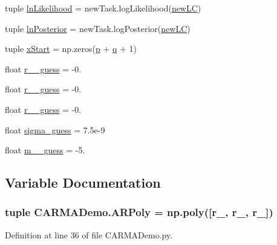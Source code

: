 \begin{DoxyCompactItemize}
\item 
tuple \hyperlink{namespace_c_a_r_m_a_demo_adb10228a4680a9d3c21526a3b3255882}{ln\-Likelihood} = new\-Task.\-log\-Likelihood(\hyperlink{namespace_c_a_r_m_a_demo_a00f90358447346616f81cdf0ba8454e2}{new\-L\-C})
\item 
tuple \hyperlink{namespace_c_a_r_m_a_demo_aac99121f005f33a0a43e2daf6480c639}{ln\-Posterior} = new\-Task.\-log\-Posterior(\hyperlink{namespace_c_a_r_m_a_demo_a00f90358447346616f81cdf0ba8454e2}{new\-L\-C})
\item 
tuple \hyperlink{namespace_c_a_r_m_a_demo_a4a968eb0ebec9a8a1dd2e0beb557ee70}{x\-Start} = np.\-zeros(\hyperlink{namespace_c_a_r_m_a_demo_adf3b3082a9cb9203add8b494f5932ba8}{p} + \hyperlink{namespace_c_a_r_m_a_demo_a71450e798960cbdb932b7f4721305832}{q} + 1)
\item 
float \hyperlink{namespace_c_a_r_m_a_demo_a8b7943e46d7401e7e312db8d3a353363}{r\-\_\-\_\-guess} = -\/0.
\item 
float \hyperlink{namespace_c_a_r_m_a_demo_a845035ed251a896d63845939de16a0a6}{r\-\_\-\_\-guess} = -\/0.
\item 
float \hyperlink{namespace_c_a_r_m_a_demo_a2e51a245e221cda099201dff37dd968a}{r\-\_\-\_\-guess} = -\/0.
\item 
float \hyperlink{namespace_c_a_r_m_a_demo_a00552ce8d2ff001c98731086d3221a4b}{sigma\-\_\-guess} = 7.\-5e-\/9
\item 
float \hyperlink{namespace_c_a_r_m_a_demo_a5734b5874a86b8f0eda0a44a74a30fed}{m\-\_\-\_\-guess} = -\/5.
\end{DoxyCompactItemize}


\subsection{Variable Documentation}
\hypertarget{namespace_c_a_r_m_a_demo_a0bd7421159653b05873148bf10b1e507}{
\subsubsection[{A\-R\-Poly}]{\setlength{\rightskip}{0pt plus 5cm}tuple C\-A\-R\-M\-A\-Demo.\-A\-R\-Poly = np.\-poly(\mbox{[}{\bf r\-\_}, {\bf r\-\_}, {\bf r\-\_}\mbox{]})}}\label{namespace_c_a_r_m_a_demo_a0bd7421159653b05873148bf10b1e507}


Definition at line 36 of file C\-A\-R\-M\-A\-Demo.\-py.


